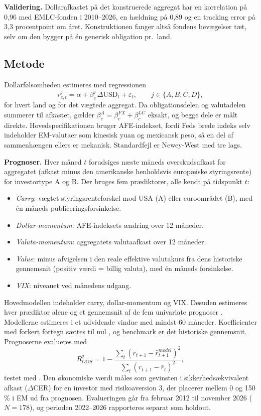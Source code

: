 \documentclass[11pt,a4paper]{article}
\begin{document}
\textbf{Validering.} Dollarafkastet på det konstruerede aggregat har en korrelation på 0,96 med EMLC-fonden i 2010--2026, en hældning på 0,89 og en tracking error på 3,3 procentpoint om året. Konstruktionen fanger altså fondens bevægelser tæt, selv om den bygger på én generisk obligation pr.\ land.

\subsection{Metode}
Dollarfølsomheden estimeres med regressionen
\begin{equation}
r^{j}_{c,t} = \alpha + \beta^{j}_{c}\,\Delta \text{USD}_t + \varepsilon_{t}, \qquad j \in \{A,B,C,D\},
\label{eq:reg}
\end{equation}
for hvert land og for det vægtede aggregat. Da obligationsdelen og valutadelen summerer til afkastet, gælder $\beta^{A}_c = \beta^{FX}_c + \beta^{LC}_c$ eksakt, og begge dele er målt direkte. Hovedspecifikationen bruger AFE-indekset, fordi Feds brede indeks selv indeholder EM-valutaer som kinesisk yuan og mexicansk peso, så en del af sammenhængen ellers er mekanisk. Standardfejl er Newey-West med tre lags.

\textbf{Prognoser.} Hver måned $t$ forudsiges næste måneds overskudsafkast for aggregatet (afkast minus den amerikanske henholdsvis europæiske styringsrente) for investortype A og B. Der bruges fem prædiktorer, alle kendt på tidspunkt $t$:
\begin{itemize}[leftmargin=1.2em,itemsep=0.1em]
\item \emph{Carry}: vægtet styringsrenteforskel mod USA (A) eller euroområdet (B), med én måneds publiceringsforsinkelse.
\item \emph{Dollar-momentum}: AFE-indeksets ændring over 12 måneder.
\item \emph{Valuta-momentum}: aggregatets valutaafkast over 12 måneder.
\item \emph{Value}: minus afvigelsen i den reale effektive valutakurs fra dens historiske gennemsnit (positiv værdi = billig valuta), med én måneds forsinkelse.
\item \emph{VIX}: niveauet ved månedens udgang.
\end{itemize}
Hovedmodellen indeholder carry, dollar-momentum og VIX. Desuden estimeres hver prædiktor alene og et gennemsnit af de fem univariate prognoser \citep{rapach2010}. Modellerne estimeres i et udvidende vindue med mindst 60 måneder. Koefficienter med forkert fortegn sættes til nul \citep{campbell2008}, og benchmark er det historiske gennemsnit. Prognoserne evalueres med
\begin{equation}
R^2_{OOS} = 1 - \frac{\sum_t (r_{t+1} - \hat r^{model}_{t+1})^2}{\sum_t (r_{t+1} - \bar r_t)^2},
\end{equation}
testet med \citet{clark2007}. Den økonomiske værdi måles som gevinsten i sikkerhedsækvivalent afkast ($\Delta$CER) for en investor med risikoaversion 3, der placerer mellem 0 og 150\,\% i EM ud fra prognosen. Evalueringen går fra februar 2012 til november 2026 ($N=178$), og perioden 2022--2026 rapporteres separat som holdout.
\end{document}
